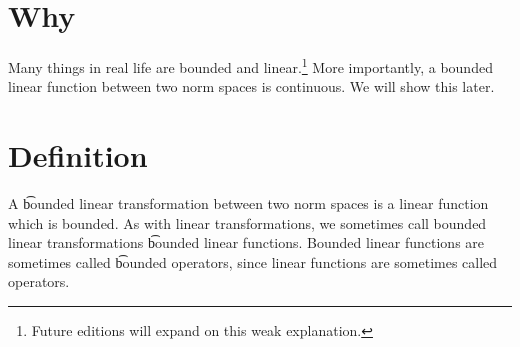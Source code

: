 

\section*{Why}

Many things in real life are bounded and linear.\footnote{Future editions will expand on this weak explanation.}
More importantly, a bounded linear function between two norm spaces is continuous.
We will show this later.

\section*{Definition}

A \t{bounded linear transformation} between two norm spaces is a linear function which is bounded.
As with linear transformations, we sometimes call bounded linear transformations \t{bounded linear functions}.
Bounded linear functions are sometimes called \t{bounded operators}, since linear functions are sometimes called operators.

\blankpage